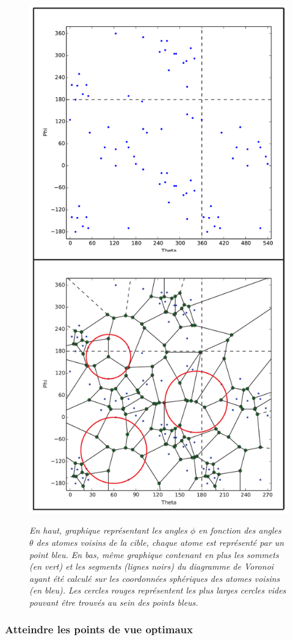 \begin{figure}[h]
  \centering
  {\includegraphics[width=.5\linewidth]{./figures/ch3/voronoi_diagram}}
    \caption[Graphique représentant les angles $\phi$ en fonction des angles $\theta$ des atomes voisins de la cible.]{{\it En haut, graphique représentant les angles $\phi$ en fonction des angles $\theta$ des atomes voisins de la cible, chaque atome est représenté par un point bleu. En bas, même graphique contenant en plus les sommets (en vert) et les segments (lignes noirs) du diagramme de Voronoi ayant été calculé sur les coordonnées sphériques des atomes voisins (en bleu). Les cercles rouges représentent les plus larges cercles vides pouvant être trouvés au sein des points bleus.}}
  \label{Fig:voronoi_diagram}
  \hspace{0.2cm}
\end{figure}

\subsubsection{Atteindre les points de vue optimaux}

